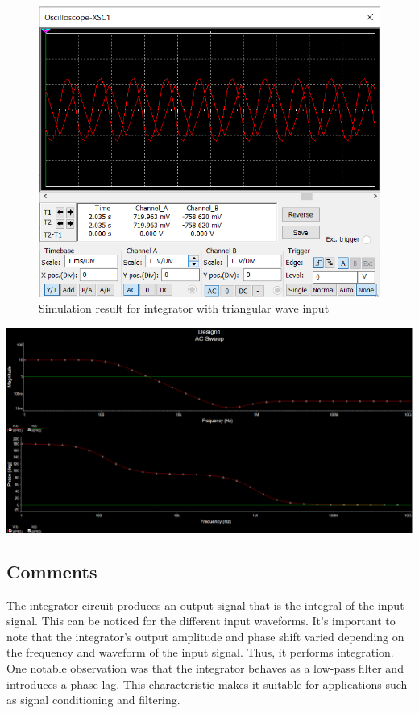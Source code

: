 \documentclass[a4paper, 12pt, english]{article}
\newenvironment{Figure}
  {\par\medskip\noindent\minipage{\linewidth}}
  {\endminipage\par\medskip}
\newlength{\simheight}
\begin{document}
\begin{figure}[H]
    \centering
    \includegraphics[width=\linewidth, height=0.8\simheight]{images/intg triangle.png}
    \caption{Simulation result for integrator with triangular wave input}
    \label{fig:Simulation result for integrator with triangular wave input}
\end{figure}

\begin{Figure}
 \centering
 \includegraphics[width=\linewidth, scale=2]{images/intg freq res.png}
\end{Figure}

\subsection{Comments}
The integrator circuit produces an output signal that is the integral of the input signal. This can be noticed for the different input waveforms. It's important to note that the integrator's output amplitude and phase shift varied depending on the frequency and waveform of the input signal. Thus, it performs integration. One notable observation was that the integrator behaves as a low-pass filter and introduces a phase lag. This characteristic makes it suitable for applications such as signal conditioning and filtering.
\end{document}
